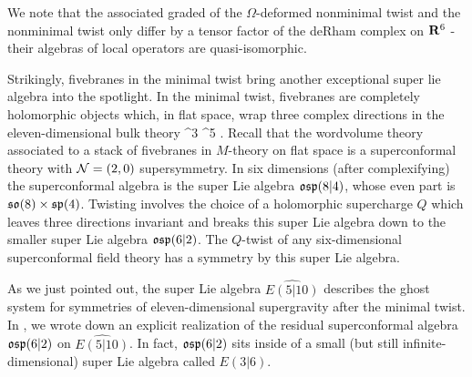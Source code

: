 We note that the associated graded of the $\Omega$-deformed nonminimal twist and the nonminimal twist only differ by a tensor factor of the deRham complex on $\mathbf{R}^{6}$ - their algebras of local operators are quasi-isomorphic.


Strikingly, fivebranes in the minimal twist bring another exceptional super lie algebra into the spotlight. In the minimal twist, fivebranes are completely holomorphic objects which, in flat space, wrap three complex directions in the eleven-dimensional bulk theory
\beqn
\C^3 \subset \R \times \C^5 .
\eeqn
Recall that the wordvolume theory associated to a stack of fivebranes in $M$-theory on flat space is a superconformal theory with $\mathcal N=(2,0)$ supersymmetry. In six dimensions (after complexifying) the superconformal algebra is the super Lie algebra $\mathfrak{osp}(8|4)$, whose even part is $\mathfrak{so}(8) \times \mathfrak{sp}(4)$. Twisting involves the choice of a holomorphic supercharge $Q$ which leaves three directions invariant and breaks this super Lie algebra down to the smaller super Lie algebra $\mathfrak{osp}(6|2)$. The $Q$-twist of any six-dimensional superconformal field theory has a symmetry by this super Lie algebra.

As we just pointed out, the super Lie algebra $\widehat {E(5|10)}$ describes the ghost system for symmetries of eleven-dimensional supergravity after the minimal twist.
In \cite{RSW}, we wrote down an explicit realization of the residual superconformal algebra $\mathfrak{osp}(6|2)$ on $\widehat {E(5|10)}$.
In fact, $\mathfrak{osp}(6|2)$ sits inside of a small (but still infinite-dimensional) super Lie algebra called $E(3|6)$. 

